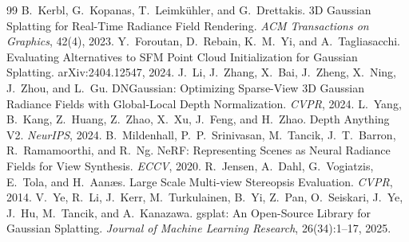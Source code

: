 \documentclass[10pt,a4paper]{article}
\begin{document}
\begin{thebibliography}{99}\small
{} B.~Kerbl, G.~Kopanas, T.~Leimk\"uhler, and G.~Drettakis. 3D
Gaussian Splatting for Real-Time Radiance Field Rendering. \emph{ACM Transactions on
Graphics}, 42(4), 2023.
 Y.~Foroutan, D.~Rebain, K.~M.~Yi, and A.~Tagliasacchi.
Evaluating Alternatives to SFM Point Cloud Initialization for Gaussian Splatting.
arXiv:2404.12547, 2024.
 J.~Li, J.~Zhang, X.~Bai, J.~Zheng, X.~Ning, J.~Zhou, and L.~Gu.
DNGaussian: Optimizing Sparse-View 3D Gaussian Radiance Fields with Global-Local Depth
Normalization. \emph{CVPR}, 2024.
 L.~Yang, B.~Kang, Z.~Huang, Z.~Zhao, X.~Xu, J.~Feng, and H.~Zhao.
Depth Anything V2. \emph{NeurIPS}, 2024.
 B.~Mildenhall, P.~P.~Srinivasan, M.~Tancik, J.~T.~Barron,
R.~Ramamoorthi, and R.~Ng. NeRF: Representing Scenes as Neural Radiance Fields for
View Synthesis. \emph{ECCV}, 2020.
 R.~Jensen, A.~Dahl, G.~Vogiatzis, E.~Tola, and H.~Aan\ae s. Large
Scale Multi-view Stereopsis Evaluation. \emph{CVPR}, 2014.
 V.~Ye, R.~Li, J.~Kerr, M.~Turkulainen, B.~Yi, Z.~Pan, O.~Seiskari,
J.~Ye, J.~Hu, M.~Tancik, and A.~Kanazawa. gsplat: An Open-Source Library for Gaussian
Splatting. \emph{Journal of Machine Learning Research}, 26(34):1--17, 2025.
\end{thebibliography}
\end{document}
